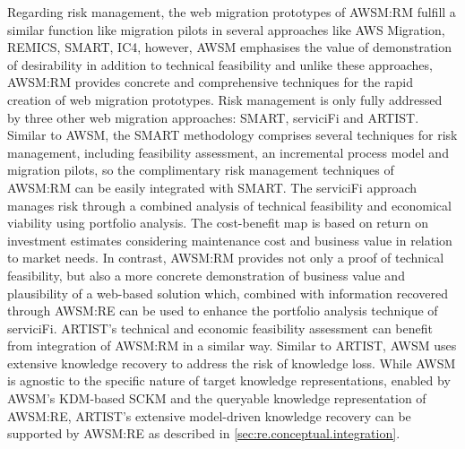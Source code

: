 Regarding risk management, the web migration prototypes of AWSM:RM fulfill a similar function like migration pilots in several approaches like AWS Migration, REMICS, SMART, IC4, however, AWSM emphasises the value of demonstration of desirability in addition to technical feasibility and unlike these approaches, AWSM:RM provides concrete and comprehensive techniques for the rapid creation of web migration prototypes.
Risk management is only fully addressed by three other web migration approaches: SMART, serviciFi and ARTIST.
Similar to AWSM, the SMART methodology comprises several techniques for risk management, including feasibility assessment, an incremental process model and migration pilots, so the complimentary risk management techniques of AWSM:RM can be easily integrated with SMART.
The serviciFi approach manages risk through a combined analysis of technical feasibility and economical viability using portfolio analysis.
The cost-benefit map is based on return on investment estimates considering maintenance cost and business value in relation to market needs.
In contrast, AWSM:RM provides not only a proof of technical feasibility, but also a more concrete demonstration of business value and plausibility of a web-based solution which, combined with information recovered through AWSM:RE can be used to enhance the portfolio analysis technique of serviciFi.
ARTIST's technical and economic feasibility assessment can benefit from integration of AWSM:RM in a similar way.
Similar to ARTIST, AWSM uses extensive knowledge recovery to address the risk of knowledge loss.
While AWSM is agnostic to the specific nature of target knowledge representations, enabled by AWSM's KDM-based SCKM and the queryable knowledge representation of AWSM:RE, ARTIST's extensive model-driven knowledge recovery can be supported by AWSM:RE as described in \cref{sec:re.conceptual.integration}.


